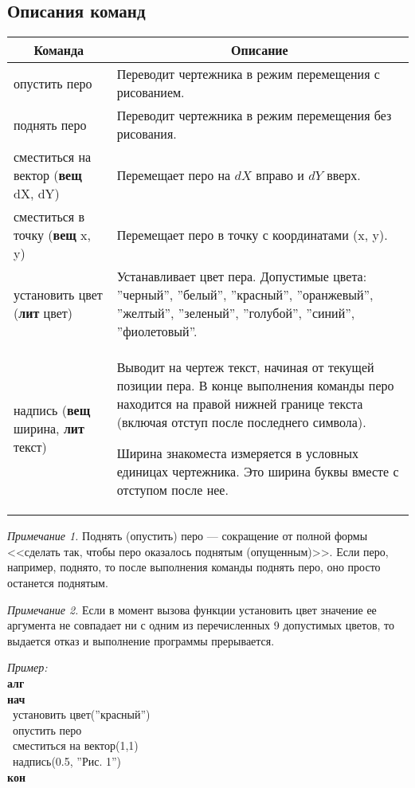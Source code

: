 \documentclass[12pt,a4paper]{article}
\newcommand{\otstup}{\textperiodcentered\ }
\begin{document}
\subsection{Описания команд}
\begin{center}
\begin{tabular}{||p{4cm}|p{12cm}||}
\hline
\hline
\multicolumn{1}{||c|}{\bfseries Команда} & \multicolumn{1}{|c||}{\bfseries Описание}\\
\hline
	опустить перо &
	Переводит чертежника в режим перемещения с рисованием.\\
\hline
	поднять перо &
	Переводит чертежника в режим перемещения без рисования.\\
\hline
	сместиться на вектор (\textbf{вещ} dX, dY) &
	Перемещает перо на $dX$ вправо и $dY$ вверх.\\
\hline
	сместиться в точку (\textbf{вещ} x, y) &
	Перемещает перо в точку с координатами (x, y).\\
\hline
	установить цвет (\textbf{лит} цвет) &
	Устанавливает цвет пера. \footnotesize Допустимые цвета: ''черный'', ''белый'', ''красный'', ''оранжевый'', ''желтый'', ''зеленый'', ''голубой'', ''синий'', ''фиолетовый''.\\
\hline
\raggedright надпись (\textbf{вещ} \mbox{ширина}, \textbf{лит} текст) &
\small Выводит на чертеж текст, начиная от текущей позиции пера. В конце выполнения команды перо находится на правой нижней границе текста (включая отступ после последнего символа).

Ширина знакоместа измеряется в условных единицах чертежника. Это ширина буквы вместе с отступом после нее.\\
\hline
\hline
\end{tabular}
\end{center}

\emph{Примечание 1.} Поднять (опустить) перо --- сокращение от полной формы <<сделать так, чтобы перо оказалось поднятым (опущенным)>>. Если перо, например, поднято, то после выполнения команды \textsf{поднять перо}, оно просто останется поднятым.

\emph{Примечание 2.} Если в момент вызова функции \textsf{установить цвет} значение ее аргумента не совпадает ни с одним из перечисленных 9 допустимых цветов, то выдается отказ и выполнение программы прерывается.

\emph{Пример:}\\
{\sffamily
\textbf{алг}\\
\textbf{нач}\\
\otstup установить цвет(''красный'')\\
\otstup опустить перо\\
\otstup сместиться на вектор(1,1)\\
\otstup надпись(0.5, ''Рис. 1'')\\
\textbf{кон}
}
\end{document}
